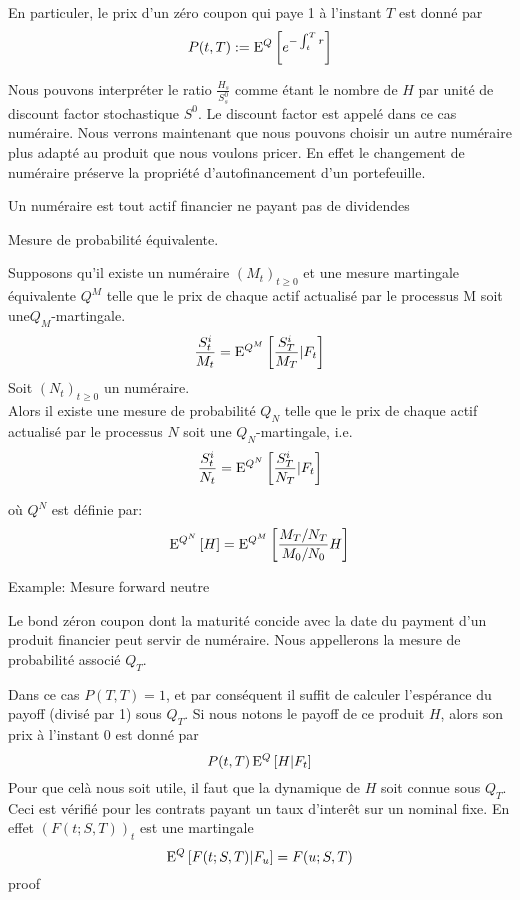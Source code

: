En particuler, le prix d'un zéro coupon qui paye 1 à l'instant $T$ est donné par
$$ P(t, T) := \mathrm{E}^Q \left[   e^{-\int_t^T r}  \right] $$


Nous pouvons interpréter le ratio $\frac{H_s}{ S^0_s}$ comme étant le nombre  de $H$ par unité de discount factor stochastique $S^0$. Le discount factor est appelé dans ce cas numéraire. Nous verrons maintenant que nous pouvons choisir un autre numéraire plus adapté au produit que nous voulons pricer.
En effet le changement de numéraire préserve la propriété d'autofinancement d'un portefeuille.

\begin{defn} Un numéraire est tout actif financier ne payant pas de dividendes \end{defn}

\begin{defn} Mesure de probabilité équivalente.
  
Supposons qu’il existe un numéraire $(M_t )_{t \geq 0}$ et une mesure martingale équivalente $Q^M$ telle que le prix de chaque actif actualisé par le processus M soit une$Q_M$-martingale. 
$$ \frac{S^i_t}{M_t} = \mathrm{E}^{Q^M} \left[  \frac{S^i_T}{M_T} | F_t \right]$$
Soit $(N_t )_{t \geq 0}$ un numéraire. \\
Alors il existe une mesure de probabilité $Q_N$ telle que le prix de chaque actif actualisé par le processus $N$ soit une $Q_N$-martingale, i.e.
$$ \frac{S^i_t}{N_t} = \mathrm{E}^{Q^N} \left[  \frac{S^i_T}{N_T} | F_t \right]$$

où $Q^N$ est définie par:
$$\mathrm{E}^{Q^N} \left[  H  \right] = \mathrm{E}^{Q^M} \left[  \frac{ M_T/N_T}{M_0/N_0} H \right]$$

\end{defn}

Example: Mesure forward neutre

Le bond zéron coupon dont la maturité concide avec la date du payment d'un produit financier peut servir de numéraire. Nous appellerons la mesure de probabilité associé $Q_T$.

Dans ce cas $P(T, T) = 1$, et par conséquent il suffit de calculer l'espérance du payoff (divisé par 1) sous $Q_T$.
Si nous notons le payoff de ce produit $H$, alors son prix à l'instant $0$ est donné par $$P(t, T) \, \mathrm{E}^Q \left[  H | F_t  \right] $$
Pour que celà nous soit utile, il faut que la dynamique de $H$ soit connue sous $Q_T$. Ceci est vérifié pour les contrats payant un taux d'interêt sur un nominal fixe. En effet $(F(t; S, T))_t$ est une martingale 
$$ \mathrm{E}^Q \left[  F(t; S, T) | F_u  \right] = F(u; S, T)$$
proof

\newpage

